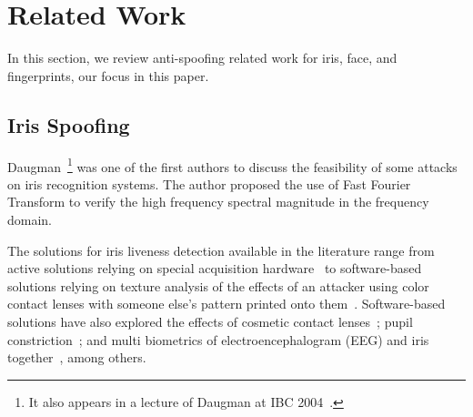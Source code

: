 \section{Related Work}
\label{sec:relatedwork}
In this section, we review anti-spoofing related work for iris, face, and fingerprints, our focus in this paper.

\subsection{Iris Spoofing}
Daugman~\cite[Section 8 -- Countermeasures against Subterfuge]{Daugman:1999}\footnote{It also appears in a lecture of Daugman at IBC 2004~\cite{ Daugman:IBC:2004}.} was one of the first authors to discuss the feasibility of some attacks on iris recognition systems. The author proposed the use of Fast Fourier Transform to verify the high frequency spectral magnitude in the frequency domain.


The solutions for iris liveness detection available in the literature range from active solutions relying on  special acquisition hardware~\cite{Lee:LNCS:2005,Pacut:2006,Kanematsu:2007} to software-based solutions relying on texture analysis of the  effects of an attacker using color contact lenses with someone else's pattern printed onto them~\cite{Wei:2008}. Software-based solutions have also explored the effects of cosmetic contact lenses~\cite{Kohli:ICB:2013,Doyle:BTAS:2013,Bowyer:Computer:2014,Yadav:TIFS:2014}; pupil constriction~\cite{Huang:WACV:2013}; and multi biometrics of  electroencephalogram (EEG) and iris together~\cite{Kathikeyan:ICCCA:2012}, among others.



